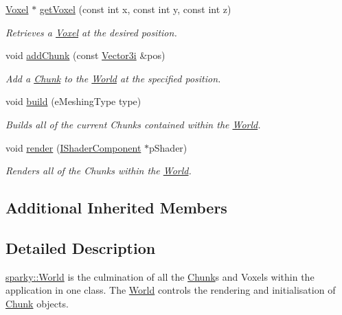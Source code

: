 \begin{DoxyCompactItemize}
\hyperlink{classsparky_1_1_voxel}{Voxel} $\ast$ \hyperlink{classsparky_1_1_world_aee1c26e22eedbe6492e73c63e029b32e}{get\+Voxel} (const int x, const int y, const int z)
\begin{DoxyCompactList}\small\item\em Retrieves a \hyperlink{classsparky_1_1_voxel}{Voxel} at the desired position. \end{DoxyCompactList}\item 
void \hyperlink{classsparky_1_1_world_a43c01651253a4cce96590bd72b0a08eb}{add\+Chunk} (const \hyperlink{classsparky_1_1_vector3}{Vector3i} \&pos)
\begin{DoxyCompactList}\small\item\em Add a \hyperlink{classsparky_1_1_chunk}{Chunk} to the \hyperlink{classsparky_1_1_world}{World} at the specified position. \end{DoxyCompactList}\item 
void \hyperlink{classsparky_1_1_world_a302f88fb61524f894108c849d0b81600}{build} (e\+Meshing\+Type type)
\begin{DoxyCompactList}\small\item\em Builds all of the current Chunks contained within the \hyperlink{classsparky_1_1_world}{World}. \end{DoxyCompactList}\item 
void \hyperlink{classsparky_1_1_world_a787081a16bd8e00747dc75d617990494}{render} (\hyperlink{classsparky_1_1_i_shader_component}{I\+Shader\+Component} $\ast$p\+Shader)
\begin{DoxyCompactList}\small\item\em Renders all of the Chunks within the \hyperlink{classsparky_1_1_world}{World}. \end{DoxyCompactList}\end{DoxyCompactItemize}
\subsection*{Additional Inherited Members}


\subsection{Detailed Description}
\hyperlink{classsparky_1_1_world}{sparky\+::\+World} is the culmination of all the \hyperlink{classsparky_1_1_chunk}{Chunk}\textquotesingle{}s and Voxels within the application in one class. The \hyperlink{classsparky_1_1_world}{World} controls the rendering and initialisation of \hyperlink{classsparky_1_1_chunk}{Chunk} objects.

